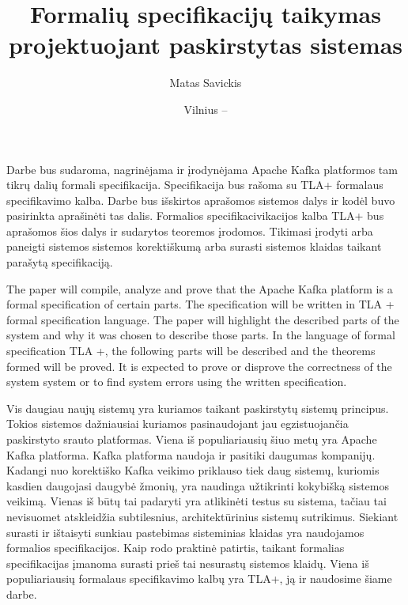 \documentclass{VUMIFPSmagistrinis}
\title{Formalių specifikacijų taikymas projektuojant paskirstytas sistemas}
\author{Matas Savickis}
\date{Vilnius – \the\year}
\begin{document}
\maketitle


	Darbe bus sudaroma, nagrinėjama ir įrodynėjama Apache Kafka platformos tam tikrų dalių formali specifikacija.
	Specifikacija bus rašoma su TLA+ formalaus specifikavimo kalba.
	Darbe bus išskirtos aprašomos sistemos dalys ir kodėl buvo pasirinkta aprašinėti tas dalis.
	Formalios specifikacivikacijos kalba TLA+ bus aprašomos šios dalys ir sudarytos teoremos įrodomos.
	Tikimasi įrodyti arba paneigti sistemos sistemos korektiškumą arba surasti sistemos klaidas taikant parašytą specifikaciją.
	
 
	



	The paper will compile, analyze and prove that the Apache Kafka platform is a formal specification of certain parts.
	The specification will be written in TLA + formal specification language.
	The paper will highlight the described parts of the system and why it was chosen to describe those parts.
	In the language of formal specification TLA +, the following parts will be described and the theorems formed will be proved.
	It is expected to prove or disprove the correctness of the system system or to find system errors using the written specification.

\tableofcontents

	Vis daugiau naujų sistemų yra kuriamos taikant paskirstytų sistemų principus.
	Tokios sistemos dažniausiai kuriamos pasinaudojant jau egzistuojančia paskirstyto srauto platformas.
	Viena iš populiariausių šiuo metų yra Apache Kafka platforma.
	Kafka platforma naudoja ir pasitiki daugumas kompanijų.
	Kadangi nuo korektiško Kafka veikimo priklauso tiek daug sistemų, kuriomis kasdien daugojasi daugybė žmonių, yra naudinga užtikrinti kokybišką sistemos veikimą.
	Vienas iš būtų tai padaryti yra atlikinėti testus su sistema, tačiau tai nevisuomet atskleidžia subtilesnius, architektūrinius sistemų sutrikimus.
	Siekiant surasti ir ištaisyti sunkiau pastebimas sisteminias klaidas yra naudojamos formalios specifikacijos.
	Kaip rodo praktinė patirtis, taikant formalias specifikacijas įmanoma surasti prieš tai nesurastų sistemos klaidų.
	Viena iš populiariausių formalaus specifikavimo kalbų yra TLA+, ją ir naudosime šiame darbe.
 
\end{document}
